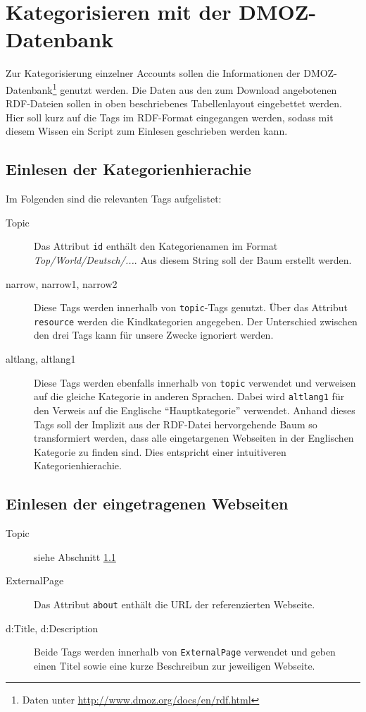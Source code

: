 \section{Kategorisieren mit der DMOZ-Datenbank}
Zur Kategorisierung einzelner Accounts sollen die Informationen der DMOZ-Datenbank\footnote{Daten unter \url{http://www.dmoz.org/docs/en/rdf.html}} genutzt werden. Die Daten aus den zum Download angebotenen RDF-Dateien sollen in oben beschriebenes Tabellenlayout eingebettet werden. Hier soll kurz auf die Tags im RDF-Format eingegangen werden, sodass mit diesem Wissen ein Script zum Einlesen geschrieben werden kann.

\subsection{Einlesen der Kategorienhierachie}\label{sec:katHierachie}
Im Folgenden sind die relevanten Tags aufgelistet:
\begin{description}
	\item[Topic] Das Attribut \lstinline{id} enthält den Kategorienamen im Format \emph{Top/World/Deutsch/...}. Aus diesem String soll der Baum erstellt werden.
	\item[narrow, narrow1, narrow2] Diese Tags werden innerhalb von \lstinline{topic}-Tags genutzt. Über das Attribut \lstinline{resource} werden die Kindkategorien angegeben. Der Unterschied zwischen den drei Tags kann für unsere Zwecke ignoriert werden.
	\item[altlang, altlang1] Diese Tags werden ebenfalls innerhalb von \lstinline{topic} verwendet und verweisen auf die gleiche Kategorie in anderen Sprachen. Dabei wird \lstinline{altlang1} für den Verweis auf die Englische "`Hauptkategorie"' verwendet. Anhand dieses Tags soll der Implizit aus der RDF-Datei hervorgehende Baum so transformiert werden, dass alle eingetargenen Webseiten in der Englischen Kategorie zu finden sind. Dies entspricht einer intuitiveren Kategorienhierachie.
\end{description}

\subsection{Einlesen der eingetragenen Webseiten}
\begin{description}
	\item[Topic] siehe Abschnitt \ref{sec:katHierachie}
	\item[ExternalPage] Das Attribut \lstinline{about} enthält die URL der referenzierten Webseite.
	\item[d:Title, d:Description] Beide Tags werden innerhalb von \lstinline{ExternalPage} verwendet und geben einen Titel sowie eine kurze Beschreibun zur jeweiligen Webseite.
\end{description}